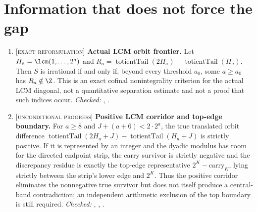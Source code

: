 \documentclass[11pt]{article}
\newcommand{\Stot}{S}
\newcommand{\stag}[1]{{\normalfont\footnotesize\textsc{[#1]}}}
\begin{document}
\section{Information that does not force the gap}\label{sec:nogo}
\begin{enumerate}
\item\label{res:actualorbit} \stag{exact reformulation}
\textbf{Actual LCM orbit frontier.}  Let
$H_a=\lcm(1,\ldots,2^a)$ and
$R_a=\operatorname{totientTail}(2H_a)-\operatorname{totientTail}(H_a)$.
Then $\Stot$ is irrational if and only if, beyond every threshold $a_0$,
some $a\ge a_0$ has $R_a\notin\Z$.  This is an exact cofinal
nonintegrality criterion for the actual LCM diagonal, not a quantitative
separation estimate and not a proof that such indices occur.
{\footnotesize\emph{Checked:}
,
.}

\item\label{res:actualsign} \stag{unconditional progress}
\textbf{Positive LCM corridor and top-edge boundary.}  For $a\ge8$ and
$J+(a+6)<2\cdot2^a$, the true translated orbit difference
$\operatorname{totientTail}(2H_a+J)-\operatorname{totientTail}(H_a+J)$ is
strictly positive.  If it is represented by an integer and the dyadic
modulus has room for the directed endpoint strip, the carry survivor is
strictly negative and the discrepancy residue is exactly the top-edge
representative $2^K-\mathrm{carry}_K$, lying strictly between the strip's lower
edge and $2^K$.  Thus the positive corridor eliminates the nonnegative true
survivor but does not itself produce a central-band contradiction; an
independent arithmetic exclusion of the top boundary is still required.
{\footnotesize\emph{Checked:}
,
,
.}


\end{enumerate}
\end{document}
